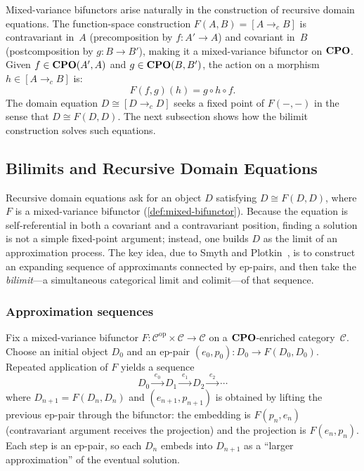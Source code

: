 Mixed-variance bifunctors arise naturally in the construction of
recursive domain equations. The function-space construction
$F(A, B) = [A \to_c B]$ is contravariant in~$A$ (precomposition by
$f : A' \to A$) and covariant in~$B$ (postcomposition by
$g : B \to B'$), making it a mixed-variance bifunctor on $\mathbf{CPO}$. Given
$f \in \mathbf{CPO}(A', A)$ and $g \in \mathbf{CPO}(B, B')$, the action on a morphism
$h \in [A \to_c B]$ is:
\[
  F(f, g)(h) = g \circ h \circ f.
\]
The domain equation $D \cong [D \to_c D]$ seeks a fixed point of
$F(-, -)$ in the sense that $D \cong F(D, D)$.  The next subsection
shows how the bilimit construction solves such equations.

\subsection{Bilimits and Recursive Domain Equations}
\label{sec:bg-bilimits}

Recursive domain equations ask for an object $D$ satisfying
$D \cong F(D, D)$, where $F$ is a mixed-variance bifunctor
(\cref{def:mixed-bifunctor}).  Because the equation is self-referential
in both a covariant and a contravariant position, finding a
solution is not a simple fixed-point argument; instead, one builds $D$
as the limit of an approximation process.  The key idea, due to
Smyth and Plotkin~\cite{SmythPlotkin1982}, is to construct an expanding
sequence of approximants connected by ep-pairs, and then take the
\emph{bilimit}---a simultaneous categorical limit and colimit---of
that sequence.

\subsubsection*{Approximation sequences}

Fix a mixed-variance bifunctor
$F : \mathcal{C}^{\mathrm{op}} \times \mathcal{C} \to \mathcal{C}$
on a $\mathbf{CPO}$-enriched category~$\mathcal{C}$.  Choose an initial
object $D_0$ and an ep-pair $(e_0, p_0) : D_0 \to F(D_0, D_0)$.
Repeated application of $F$ yields a sequence
\[
  D_0 \xrightarrow{\;e_0\;}
  D_1 \xrightarrow{\;e_1\;}
  D_2 \xrightarrow{\;e_2\;}
  \cdots
\]
where $D_{n+1} = F(D_n, D_n)$ and $(e_{n+1}, p_{n+1})$ is obtained
by lifting the previous ep-pair through the bifunctor: the embedding
is $F(p_n, e_n)$ (contravariant argument receives the projection)
and the projection is $F(e_n, p_n)$.  Each step is an ep-pair,
so each $D_n$ embeds into $D_{n+1}$ as a ``larger approximation'' of
the eventual solution.

